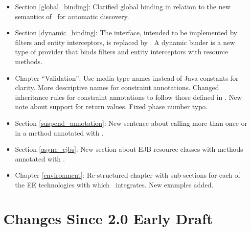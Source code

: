 \begin{itemize}
\item Section \ref{global_binding}: Clarified global binding in relation to the new semantics of \Provider\ for automatic discovery.
\item Section \ref{dynamic_binding}: The  interface, intended to be implemented by filters and entity interceptors, is replaced by . A dynamic binder is a new type of provider that binds filters and entity interceptors with resource methods. 
\item Chapter ``Validation'': Use media type names instead of Java constants for clarity. More descriptive names for constraint annotations. Changed inheritance rules for constraint annotations to follow those defined in \cite{bv11}. New note about  support for return values. Fixed phase number typo.
\item Section \ref{suspend_annotation}: New sentence about calling  more than once or in a method annotated with .
\item Section \ref{async_ejbs}: New section about EJB resource classes with methods annotated with .
\item Chapter \ref{environment}: Re-structured chapter with sub-sections for each of the EE technologies with which \jaxrs\ integrates. New examples added.
\end{itemize}

\section{Changes Since 2.0 Early Draft}

